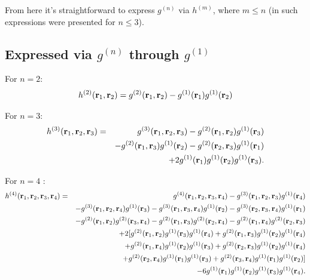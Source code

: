 From here it's straightforward to express $g^{(n)}$ via $h^{(m)}$, where $m \leq n$ (in \cite{hernandoPRA1986} such expressions were presented for $n\leq3$).

\subsection{Expressed via $g^{(n)}$ through $g^{(1)}$}
For $n=2$:
\begin{eqnarray}
h^{(2)}(\vb{r}_1,\vb{r}_2) = g^{(2)}(\vb{r}_1,\vb{r}_2) - g^{(1)}(\vb{r}_1) g^{(1)}(\vb{r}_2)
\end{eqnarray}

For $n=3$:
\begin{eqnarray}
h^{(3)}(\vb{r}_1 ,\vb{r}_2, \vb{r}_3) &=& g^{(3)}(\vb{r}_1, \vb{r}_2, \vb{r}_3) - g^{(2)}(\vb{r}_1, \vb{r}_2) g^{(1)}(\vb{r}_3)
\nonumber\\
&&-g^{(2)}(\vb{r}_1,\vb{r}_3) g^{(1)}(\vb{r}_2) -  g^{(2)}(\vb{r}_2,\vb{r}_3) g^{(1)}(\vb{r}_1)
\nonumber\\
&& +2g^{(1)}(\vb{r}_1)g^{(1)}(\vb{r}_2)g^{(1)}(\vb{r}_3).
\end{eqnarray}

For $n=4$ :
\begin{eqnarray}
h^{(4)}(\vb{r}_1, \vb{r}_2, \vb{r}_3, \vb{r}_4) &=& g^{(4)}(\vb{r}_1, \vb{r}_2, \vb{r}_3, \vb{r}_4) - g^{(3)}(\vb{r}_1, \vb{r}_2, \vb{r}_3) g^{(1)}(\vb{r}_4)
\nonumber\\
&&-g^{(3)}(\vb{r}_1, \vb{r}_2, \vb{r}_4) g^{(1)}(\vb{r}_3) -  g^{(3)}(\vb{r}_1, \vb{r}_3, \vb{r}_4) g^{(1)}(\vb{r}_2) - g^{(3)}(\vb{r}_2, \vb{r}_3, \vb{r}_4)g^{(1)}(\vb{r}_1) 
\nonumber\\
&&-g^{(2)}(\vb{r}_1,\vb{r}_2) g^{(2)}(\vb{r}_3,\vb{r}_4) - g^{(2)}(\vb{r}_1,\vb{r}_3) g^{(2)}(\vb{r}_2,\vb{r}_4) - g^{(2)}(\vb{r}_1,\vb{r}_4)g^{(2)}(\vb{r}_2,\vb{r}_3)
\nonumber\\
&& + 2[g^{(2)}(\vb{r}_1,\vb{r}_2)g^{(1)}(\vb{r}_3) g^{(1)}(\vb{r}_4) + g^{(2)}(\vb{r}_1,\vb{r}_3) g^{(1)}(\vb{r}_2) g^{(1)}(\vb{r}_4) 
\nonumber\\
&& + g^{(2)}(\vb{r}_1,\vb{r}_4)g^{(1)}(\vb{r}_2)g^{(1)}(\vb{r}_3) + g^{(2)}(\vb{r}_2,\vb{r}_3)g^{(1)}(\vb{r}_2) g^{(1)}(\vb{r}_4)
\nonumber\\
&& + g^{(2)}(\vb{r}_2,\vb{r}_4)g^{(1)}(\vb{r}_1) g^{(1)}(\vb{r}_3) + g^{(2)}(\vb{r}_3,\vb{r}_4)g^{(1)}(\vb{r}_1) g^{(1)}(\vb{r}_2) ]
\nonumber\\
&&-6g^{(1)}(\vb{r}_1) g^{(1)}(\vb{r}_2)g^{(1)}(\vb{r}_3) g^{(1)}(\vb{r}_4).
\end{eqnarray}

